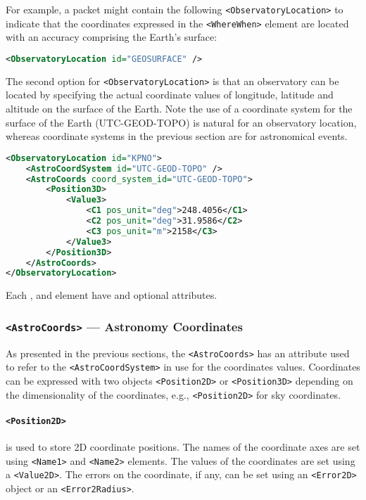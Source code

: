 \documentclass[11pt,a4paper]{ivoa}
\begin{document}
For example, a packet might contain the following \verb|<ObservatoryLocation>|
to indicate that the coordinates expressed in the \verb|<WhereWhen>| element are
located with an accuracy comprising the Earth's surface:
\begin{lstlisting}[language=XML]
<ObservatoryLocation id="GEOSURFACE" />
\end{lstlisting}

The second option for \verb|<ObservatoryLocation>| is that an observatory can be
located by specifying the actual coordinate values of longitude, latitude and
altitude on the surface of the Earth. Note the use of a coordinate system for
the surface of the Earth (UTC-GEOD-TOPO) is natural for an observatory location,
whereas coordinate systems in the previous section are for astronomical events.
\begin{lstlisting}[language=XML]
<ObservatoryLocation id="KPNO">
    <AstroCoordSystem id="UTC-GEOD-TOPO" />
    <AstroCoords coord_system_id="UTC-GEOD-TOPO">
        <Position3D>
            <Value3>
                <C1 pos_unit="deg">248.4056</C1>
                <C2 pos_unit="deg">31.9586</C2>
                <C3 pos_unit="m">2158</C3>
            </Value3>
        </Position3D>
    </AstroCoords>
</ObservatoryLocation>
\end{lstlisting}

Each ,  and  element have
 and 
optional attributes.

\subsubsection{\texttt{<AstroCoords>} --- Astronomy Coordinates}

As presented in the previous sections, the \verb|<AstroCoords>| has an
attribute  used to refer to the \verb|<AstroCoordSystem>|
in use for the coordinates values. Coordinates can be expressed with two
objects \verb|<Position2D>| or \verb|<Position3D>| depending on the dimensionality
of the coordinates, e.g., \verb|<Position2D>| for sky coordinates.

\paragraph{\texttt{<Position2D>}} is used to store 2D coordinate
positions. The names of the coordinate axes are set using \verb|<Name1>| and
\verb|<Name2>| elements. The values of the coordinates are set using a
\verb|<Value2D>|. The errors on the coordinate, if any, can be set using an
\verb|<Error2D>| object or an \verb|<Error2Radius>|.
\end{document}
